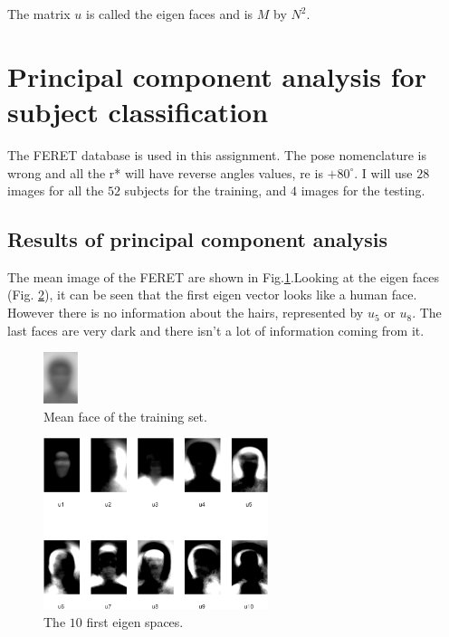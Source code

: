 \documentclass[runningheads,a4paper]{llncs}
\begin{document}
The matrix $u$ is called the eigen faces and is $M$ by $N^2$.

\section{Principal component analysis for subject classification}

The FERET database \cite{phillips1998feret} is used in this assignment. The pose nomenclature is wrong and all the r* will have reverse angles values, re is $+80^{\circ}$. 
I will use $28$ images for all the $52$ subjects for the training, and $4$ images for the testing.

\subsection{Results of principal component analysis}

The mean image of the FERET are shown in Fig.\ref{fig:mean_face}.Looking at the eigen faces (Fig. \ref{fig:10_eigen_faces}), it can be seen that the first eigen vector looks like a human face. However there is no information about the hairs, represented by $u_5$ or $u_8$. The last faces are very dark and there isn't a lot of information coming from it.

\begin{figure}
\centering
\includegraphics[height=1.5cm]{Figures/mean_face}
\caption{Mean face of the training set.}
\label{fig:mean_face}
\end{figure}



\begin{figure}
\centering
\includegraphics[height=5cm]{Figures/10_eigen_faces}
\caption{The $10$ first eigen spaces.}
\label{fig:10_eigen_faces}
\end{figure}
\end{document}
